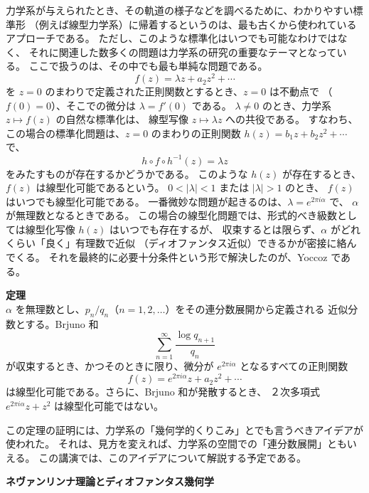 \documentclass[uplatex,dvipdfmx]{jlreq}
\begin{document}
力学系が与えられたとき、その軌道の様子などを調べるために、わかりやすい標準形
（例えば線型力学系）に帰着するというのは、最も古くから使われているアプローチである。
ただし、このような標準化はいつでも可能なわけではなく、
それに関連した数多くの問題は力学系の研究の重要なテーマとなっている。
ここで扱うのは、その中でも最も単純な問題である。
\[
  f(z) = \lambda z + a_2 z^2 + \cdots
\]
を $z = 0$ のまわりで定義された正則関数とするとき、$z = 0$ は不動点で
（$f(0) = 0$）、そこでの微分は $\lambda = f'(0)$ である。
$\lambda \neq 0$ のとき、力学系 $z \mapsto f(z)$ の自然な標準化は、
線型写像 $z \mapsto \lambda z$ への共役である。
すなわち、この場合の標準化問題は、$z = 0$ のまわりの正則関数
$h(z) = b_1 z + b_2 z^2 + \cdots$ で、
\[
  h \circ f \circ h^{-1}(z) = \lambda z
\]
をみたすものが存在するかどうかである。
このような $h(z)$ が存在するとき、$f(z)$ は線型化可能であるという。
$0 < |\lambda| < 1$ または $|\lambda| > 1$ のとき、
$f(z)$ はいつでも線型化可能である。
一番微妙な問題が起きるのは、$\lambda = e^{2\pi i\alpha}$ で、
$\alpha$ が無理数となるときである。
この場合の線型化問題では、形式的べき級数としては線型化写像 $h(z)$ はいつでも存在するが、
収束するとは限らず、$\alpha$ がどれくらい「良く」有理数で近似
（ディオファンタス近似）できるかが密接に絡んでくる。
それを最終的に必要十分条件という形で解決したのが、Yoccoz である。

\medskip

\noindent\textbf{定理}\\
$\alpha$ を無理数とし、$p_n/q_n$（$n = 1, 2, \ldots$）をその連分数展開から定義される
近似分数とする。Brjuno 和
\[
  \sum_{n=1}^{\infty} \frac{\log q_{n+1}}{q_n}
\]
が収束するとき、かつそのときに限り、微分が $e^{2\pi i\alpha}$ となるすべての正則関数
\[
  f(z) = e^{2\pi i\alpha} z + a_2 z^2 + \cdots
\]
は線型化可能である。さらに、Brjuno 和が発散するとき、
２次多項式 $e^{2\pi i\alpha} z + z^2$ は線型化可能ではない。

\medskip

この定理の証明には、力学系の「幾何学的くりこみ」とでも言うべきアイデアが使われた。
それは、見方を変えれば、力学系の空間での「連分数展開」ともいえる。
この講演では、このアイデアについて解説する予定である。

\newpage

\begin{center}
  {\Large\bfseries ネヴァンリンナ理論とディオファンタス幾何学}
\end{center}
\end{document}
